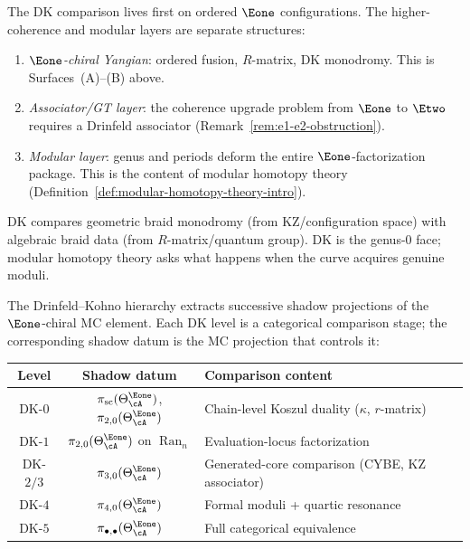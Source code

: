 \begin{remark}
\label{rem:dk-e1-factorization}
The DK comparison lives first on ordered $\Eone$ configurations.
The higher-coherence and modular layers are separate structures:
\begin{enumerate}[label=\textup{(\arabic*)}]
\item \emph{$\Eone$-chiral Yangian}: ordered fusion, $R$-matrix,
 DK monodromy. This is Surfaces~(A)--(B) above.
\item \emph{Associator/GT layer}: the coherence upgrade problem
 from $\Eone$ to $\Etwo$ requires a Drinfeld associator
 (Remark~\ref{rem:e1-e2-obstruction}).
\item \emph{Modular layer}: genus and periods deform the entire
 $\Eone$-factorization package. This is the content of modular
 homotopy theory (Definition~\ref{def:modular-homotopy-theory-intro}).
\end{enumerate}
DK compares geometric braid monodromy (from KZ/configuration
space) with algebraic braid data (from $R$-matrix/quantum group).
DK is the genus-$0$ face; modular
homotopy theory asks what happens when the curve acquires genuine
moduli.
\end{remark}

\begin{construction}
\label{constr:dk-shadow-projections}
The Drinfeld--Kohno hierarchy extracts successive shadow projections of the $\Eone$-chiral MC element. Each DK level is a categorical comparison stage; the corresponding shadow datum is the MC projection that controls it:
\begin{center}
\begin{tabular}{ccl}
\toprule
Level & Shadow datum & Comparison content \\
\midrule
DK-$0$ & $\pi_{\mathrm{sc}}(\Theta^{\Eone}_\cA)$, $\pi_{2,0}(\Theta^{\Eone}_\cA)$ & Chain-level Koszul duality ($\kappa$, $r$-matrix) \\
DK-$1$ & $\pi_{2,0}(\Theta^{\Eone}_\cA)$ on $\operatorname{Ran}_n$ & Evaluation-locus factorization \\
DK-$2/3$ & $\pi_{3,0}(\Theta^{\Eone}_\cA)$ & Generated-core comparison (CYBE, KZ associator) \\
DK-$4$ & $\pi_{4,0}(\Theta^{\Eone}_\cA)$ & Formal moduli + quartic resonance \\
DK-$5$ & $\pi_{\bullet,\bullet}(\Theta^{\Eone}_\cA)$ & Full categorical equivalence \\
\bottomrule
\end{tabular}
\end{center}
\end{construction}

